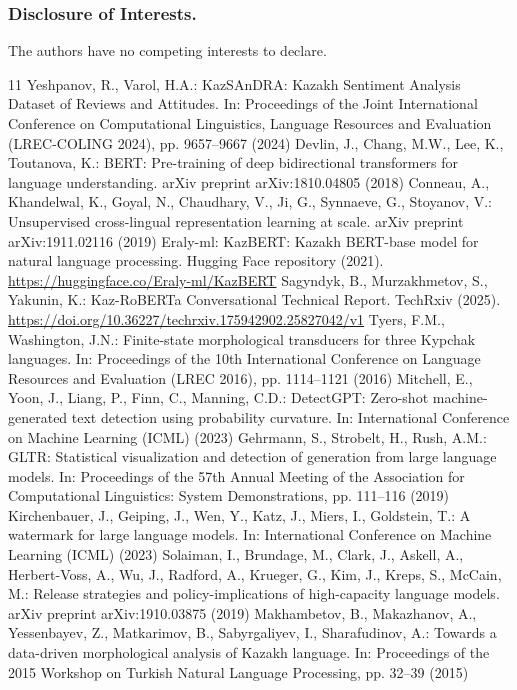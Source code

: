 \documentclass[runningheads]{llncs}
\begin{document}
\subsubsection{Disclosure of Interests.}
The authors have no competing interests to declare.

\begin{thebibliography}{11}
Yeshpanov, R., Varol, H.A.: KazSAnDRA: Kazakh Sentiment Analysis Dataset of Reviews and Attitudes. In: Proceedings of the Joint International Conference on Computational Linguistics, Language Resources and Evaluation (LREC-COLING 2024), pp. 9657–9667 (2024)
Devlin, J., Chang, M.W., Lee, K., Toutanova, K.: BERT: Pre-training of deep bidirectional transformers for language understanding. arXiv preprint arXiv:1810.04805 (2018)
Conneau, A., Khandelwal, K., Goyal, N., Chaudhary, V., Ji, G., Synnaeve, G., Stoyanov, V.: Unsupervised cross-lingual representation learning at scale. arXiv preprint arXiv:1911.02116 (2019)
Eraly-ml: KazBERT: Kazakh BERT-base model for natural language processing. Hugging Face repository (2021). \url{https://huggingface.co/Eraly-ml/KazBERT}
Sagyndyk, B., Murzakhmetov, S., Yakunin, K.: Kaz-RoBERTa Conversational Technical Report. TechRxiv (2025). \url{https://doi.org/10.36227/techrxiv.175942902.25827042/v1}
Tyers, F.M., Washington, J.N.: Finite-state morphological transducers for three Kypchak languages. In: Proceedings of the 10th International Conference on Language Resources and Evaluation (LREC 2016), pp. 1114–1121 (2016)
Mitchell, E., Yoon, J., Liang, P., Finn, C., Manning, C.D.: DetectGPT: Zero-shot machine-generated text detection using probability curvature. In: International Conference on Machine Learning (ICML) (2023)
Gehrmann, S., Strobelt, H., Rush, A.M.: GLTR: Statistical visualization and detection of generation from large language models. In: Proceedings of the 57th Annual Meeting of the Association for Computational Linguistics: System Demonstrations, pp. 111–116 (2019)
Kirchenbauer, J., Geiping, J., Wen, Y., Katz, J., Miers, I., Goldstein, T.: A watermark for large language models. In: International Conference on Machine Learning (ICML) (2023)
Solaiman, I., Brundage, M., Clark, J., Askell, A., Herbert-Voss, A., Wu, J., Radford, A., Krueger, G., Kim, J., Kreps, S., McCain, M.: Release strategies and policy-implications of high-capacity language models. arXiv preprint arXiv:1910.03875 (2019)
Makhambetov, B., Makazhanov, A., Yessenbayev, Z., Matkarimov, B., Sabyrgaliyev, I., Sharafudinov, A.: Towards a data-driven morphological analysis of Kazakh language. In: Proceedings of the 2015 Workshop on Turkish Natural Language Processing, pp. 32–39 (2015)
\end{thebibliography}
\end{document}
